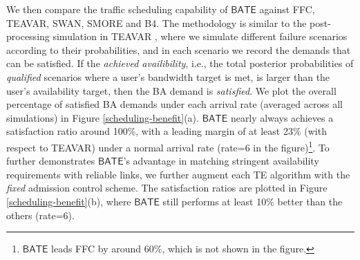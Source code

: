 \documentclass[sigconf]{acmart}
\begin{document}
We then compare the traffic scheduling capability of $\mathsf{BATE}$ against FFC, TEAVAR, SWAN, SMORE and B4.
The methodology is similar to the post-processing simulation in TEAVAR \cite{Teavar}, 
where we simulate different failure scenarios according to their probabilities, 
and in each scenario we record the demands that can be satisfied. 
If the \textit{achieved availibility}, i.e., the total posterior probabilities of \textit{qualified} scenarios where a user's bandwidth target is met, is larger than the user's availability target, 
then the BA demand is \textit{satisfied}. 
We plot the overall percentage of satisfied BA demands under each arrival rate (averaged across all simulations) in Figure \ref{scheduling-benefit}(a). $\mathsf{BATE}$ nearly always achieves a satisfaction ratio around 100\%, with a leading margin of at least 23\% (with respect to TEAVAR) under a normal arrival rate (rate=6 in the figure)\footnote{$\mathsf{BATE}$ leads FFC by around 60\%, which is not shown in the figure.}. 
To further demonstrates $\mathsf{BATE}$'s advantage in matching stringent availability requirements  
with reliable links, we further augment each TE algorithm with the \textit{fixed} admission control 
scheme. The satisfaction ratios are plotted in Figure \ref{scheduling-benefit}(b), where $\mathsf{BATE}$
still performs at least 10\% better than the others (rate=6). 
\end{document}
